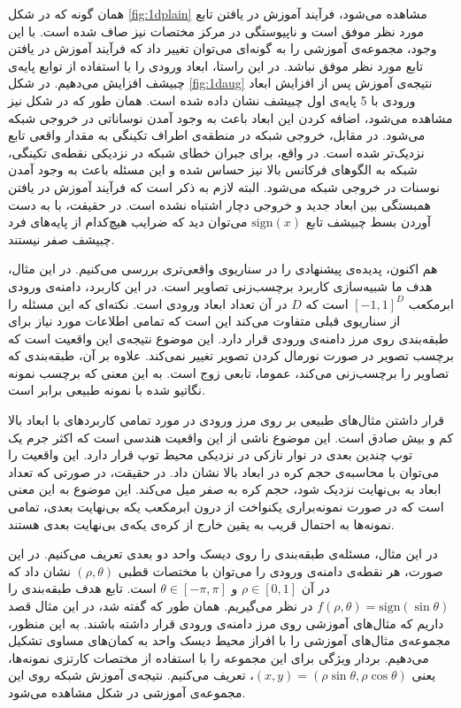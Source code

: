 \documentclass[12pt,onecolumn,a4paper]{article}
\begin{document}
همان گونه که در شکل \ref{fig:1dplain} مشاهده می‌شود، فرآیند آموزش در یافتن تابع مورد نظر موفق است و ناپیوستگی در مرکز مختصات نیز صاف شده است. با این وجود، مجموعه‌ی آموزشی را به گونه‌ای می‌توان تغییر داد که فرآیند آموزش در یافتن تابع مورد نظر موفق نباشد. در این راستا، ابعاد ورودی را با استفاده از توابع  پایه‌ی چبیشف افزایش می‌دهیم. در شکل \ref{fig:1daug} نتیجه‌ی آموزش پس از افزایش ابعاد ورودی با 5 پایه‌ی اول چبیشف نشان داده شده است. همان طور که در شکل نیز مشاهده می‌شود، اضافه کردن این ابعاد باعث به وجود آمدن نوساناتی در خروجی شبکه می‌شود. در مقابل، خروجی شبکه در منطقه‌ی اطراف تکینگی به مقدار واقعی تابع نزدیک‌تر شده است. در واقع، برای جبران خطای شبکه در نزدیکی نقطه‌ی تکینگی، شبکه به الگوهای فرکانس بالا نیز حساس شده و این مسئله باعث به وجود آمدن نوسنات در خروجی شبکه می‌شود. البته لازم به ذکر است که فرآیند آموزش در یافتن همبستگی بین ابعاد جدید و خروجی دچار اشتباه نشده است. در حقیقت، با به دست آوردن بسط چبیشف تابع $\mathrm{sign}(x)$ می‌توان دید که ضرایب هیچ‌کدام از پایه‌های فرد چبیشف صفر نیستند.

هم اکنون، پدیده‌ی پیشنهادی را در سناریوی واقعی‌تری بررسی می‌کنیم. در این مثال، هدف ما شبیه‌سازی کاربرد برچسب‌زنی تصاویر است. در این کاربرد، دامنه‌ی ورودی ابرمکعب $[-1,1]^D$ 
است که $D$ در آن تعداد ابعاد ورودی است. نکته‌ای که این مسئله را از سناریوی قبلی متفاوت می‌کند این است که تمامی اطلاعات مورد نیاز برای طبقه‌بندی روی مرز دامنه‌ی ورودی قرار دارد. این موضوع نتیجه‌ی این واقعیت است که برچسب تصویر در صورت نورمال کردن تصویر تغییر نمی‌کند. علاوه بر آن، طبقه‌بندی که تصاویر را برچسب‌زنی می‌کند، عموما، تابعی زوج است. به این معنی که برچسب نمونه نگاتیو شده با نمونه طبیعی برابر است.

قرار داشتن مثال‌های طبیعی بر روی مرز ورودی در مورد تمامی کاربردهای با ابعاد بالا کم و بیش صادق است. این موضوع ناشی از این واقعیت هندسی است که اکثر جرم یک توپ چندین بعدی در نوار نازکی در نزدیکی محیط توپ قرار دارد. این واقعیت را می‌توان با محاسبه‌ی حجم کره در ابعاد بالا نشان داد. در حقیقت، در صورتی که تعداد ابعاد به بی‌نهایت نزدیک شود، حجم کره به صفر میل می‌کند. این موضوع به این معنی است که در صورت نمونه‌براری یکنواخت از درون ابرمکعب یکه بی‌نهایت بعدی، تمامی نمونه‌ها به احتمال قریب به یقین خارج از کره‌ی یکه‌ی بی‌نهایت بعدی هستند.

در این مثال، مسئله‌ی طبقه‌بندی را روی دیسک واحد دو بعدی تعریف می‌کنیم. در این صورت، هر نقطه‌ی دامنه‌ی ورودی را می‌توان با مختصات قطبی $(\rho,\theta)$ 
 نشان داد که در آن $\rho \in [0,1]$ و $\theta \in [-\pi,\pi]$ است. 
 تابع هدف طبقه‌بندی را $f(\rho,\theta)=\mathrm{sign}(\sin \theta)$ در نظر می‌گیریم.
همان طور که گفته شد، در این مثال قصد داریم که مثال‌های آموزشی روی مرز دامنه‌ی ورودی قرار داشته باشند. به این منظور، مجموعه‌ی مثال‌های آموزشی را با افراز محیط دیسک واحد به کمان‌های مساوی تشکیل می‌دهیم. بردار ویژگی برای این مجموعه را با استفاده از مختصات کارتزی نمونه‌ها، یعنی $(x,y)=(\rho\sin\theta,\rho\cos\theta)$، تعریف می‌کنیم. نتیجه‌ی آموزش شبکه روی این مجموعه‌ی آموزشی در شکل مشاهده می‌شود.
\end{document}

